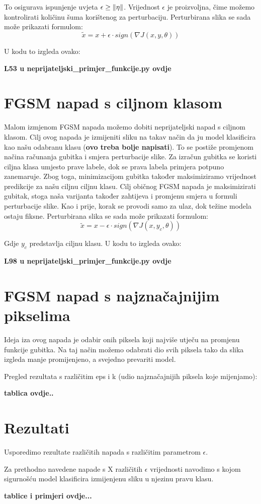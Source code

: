 To osigurava ispunjenje uvjeta $\epsilon \geq \left\|{\eta}\right\|$. Vrijednost $\epsilon$ je proizvoljna, čime možemo kontrolirati količinu šuma korištenog za perturbaciju. Perturbirana slika se sada može prikazati formulom: 
\[\widetilde{x} = x + \epsilon\cdot sign\left(\nabla J(x, y, \theta)\right)\]

U kodu to izgleda ovako:

\textbf{L53 u neprijateljski\_primjer\_funkcije.py ovdje}

\section{FGSM napad s ciljnom klasom}

Malom izmjenom FGSM napada možemo dobiti neprijateljski napad s ciljnom klasom. Cilj ovog napada je izmijeniti sliku na takav način da ju model klasificira kao našu odabranu klasu (\textbf{ovo treba bolje napisati}). To se postiže promjenom načina računanja gubitka i smjera perturbacije slike. Za izračun gubitka se koristi ciljna klasa umjesto prave labele, dok se prava labela primjera potpuno zanemaruje.  Zbog toga, minimizacijom gubitka također maksimiziramo vrijednost predikcije za našu ciljnu ciljnu klasu. Cilj običnog FGSM napada je maksimizirati gubitak, stoga naša varijanta također zahtijeva i promjenu smjera u formuli perturbacije slike. Kao i prije, korak se provodi samo za ulaz, dok težine modela ostaju fiksne. Perturbirana slika se sada može prikazati formulom: 
\[\widetilde{x} = x - \epsilon\cdot sign\left(\nabla J(x, y_c, \theta)\right)\]

Gdje $y_c$ predstavlja ciljnu klasu. U kodu to izgleda ovako:

\textbf{L98 u neprijateljski\_primjer\_funkcije.py ovdje}

\section{FGSM napad s najznačajnijim pikselima}

Ideja iza ovog napada je odabir onih piksela koji najviše utječu na promjenu funkcije gubitka. Na taj način možemo odabrati dio svih piksela tako da slika izgleda manje promijenjeno, a svejedno prevariti model. 

Pregled rezultata s različitim eps i k (udio najznačajnijih piksela koje mijenjamo): 

\textbf{tablica ovdje..}


\section{Rezultati}

Usporedimo rezultate različitih napada s različitim parametrom $\epsilon$. 

Za prethodno navedene napade s X različitih $\epsilon$ vrijednosti navodimo s kojom sigurnošću model klasificira izmijenjenu sliku u njezinu pravu klasu.

\textbf{tablice i primjeri ovdje...}

